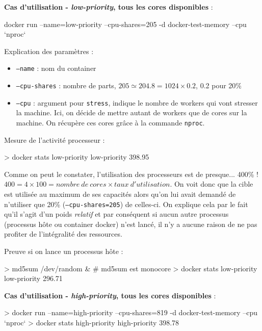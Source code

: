 \documentclass[11pt,a4paper,oneside]{report}
\newcommand{\code}[1]{\texttt{#1}}
\begin{document}
\textbf{Cas d'utilisation - \textit{low-priority}, tous les cores disponibles} :
\begin{textcode}
docker run --name=low-priority --cpu-shares=205 -d docker-test-memory --cpu `nproc`
\end{textcode}

Explication des paramètres :
\begin{itemize}
\item \code{--name} : nom du container
\item \code{--cpu-shares} : nombre de parts, $205 \simeq 204.8 = 1024 \times 0.2$, 0.2 pour 20\%
\item \code{--cpu} : argument pour \code{stress}, indique le nombre de workers qui vont stresser la machine. Ici, on décide de mettre autant de workers que de cores sur la machine. On récupère ces cores grâce à la commande \code{nproc}.
\end{itemize}

Mesure de l'activité processeur :
\begin{bashcode}
> docker stats low-priority
low-priority   398.95%
\end{bashcode}

Comme on peut le constater, l'utilisation des processeurs est de presque... 400\% ! $400 = 4 \times 100  = nombre\ de\ cores \times taux\ d'utilisation$. On voit donc que la cible est utilisée au maximum de ses capacités alors qu'on lui avait demandé de n'utiliser que 20\% (\code{--cpu-shares=205}) de celles-ci. On explique cela par le fait qu'il s'agit d'un poids \textit{relatif} et par conséquent si aucun autre processus (processus hôte ou container docker) n'est lancé, il n'y a aucune raison de ne pas profiter de l'intégralité des ressources.

Preuve si on lance un processus hôte :
\begin{bashcode}
> md5sum /dev/random & # md5sum est monocore
> docker stats low-priority
low-priority   296.71%
\end{bashcode}

\textbf{Cas d'utilisation - \textit{high-priority}, tous les cores disponibles} :
\begin{bashcode}
> docker run --name=high-priority --cpu-shares=819 -d docker-test-memory --cpu `nproc`
> docker stats high-priority
high-priority   398.78%
\end{bashcode}
\end{document}
